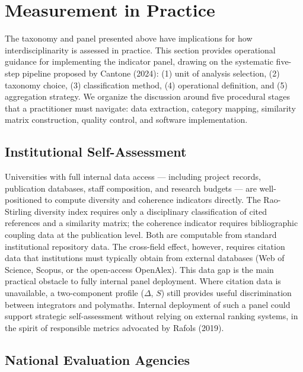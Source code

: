 \documentclass[
]{article}
\begin{document}
\hypertarget{measurement-in-practice}{%
\section{Measurement in Practice}\label{measurement-in-practice}}

The taxonomy and panel presented above have implications for how
interdisciplinarity is assessed in practice. This section provides
operational guidance for implementing the indicator panel, drawing on
the systematic five-step pipeline proposed by Cantone (2024): (1) unit
of analysis selection, (2) taxonomy choice, (3) classification method,
(4) operational definition, and (5) aggregation strategy. We organize
the discussion around five procedural stages that a practitioner must
navigate: data extraction, category mapping, similarity matrix
construction, quality control, and software implementation.

\hypertarget{institutional-self-assessment}{%
\subsection{Institutional
Self-Assessment}\label{institutional-self-assessment}}

Universities with full internal data access --- including project
records, publication databases, staff composition, and research budgets
--- are well-positioned to compute diversity and coherence indicators
directly. The Rao-Stirling diversity index requires only a disciplinary
classification of cited references and a similarity matrix; the
coherence indicator requires bibliographic coupling data at the
publication level. Both are computable from standard institutional
repository data. The cross-field effect, however, requires citation data
that institutions must typically obtain from external databases (Web of
Science, Scopus, or the open-access OpenAlex). This data gap is the main
practical obstacle to fully internal panel deployment. Where citation
data is unavailable, a two-component profile (\(\Delta\), \(S\)) still
provides useful discrimination between integrators and polymaths.
Internal deployment of such a panel could support strategic
self-assessment without relying on external ranking systems, in the
spirit of responsible metrics advocated by Rafols (2019).

\hypertarget{national-evaluation-agencies}{%
\subsection{National Evaluation
Agencies}\label{national-evaluation-agencies}}
\end{document}
